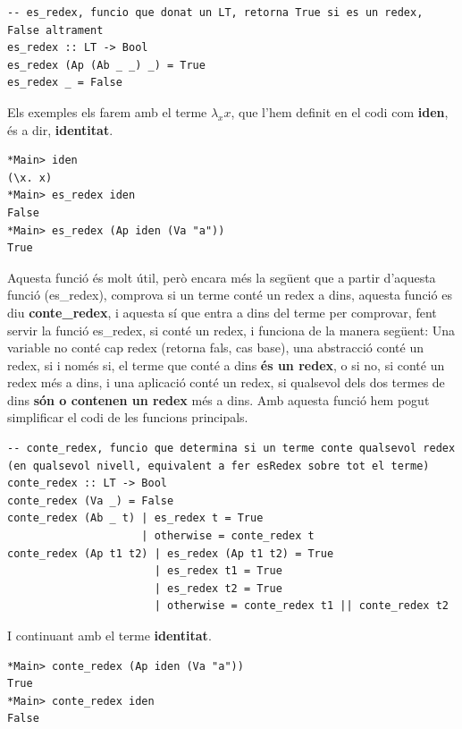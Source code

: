 \documentclass[10pt,a4paper]{article}
\begin{document}
\lstset{language=Haskell, breaklines=true, basicstyle=\footnotesize}
\begin{lstlisting}[frame=mystyle]
-- es_redex, funcio que donat un LT, retorna True si es un redex, False altrament
es_redex :: LT -> Bool
es_redex (Ap (Ab _ _) _) = True
es_redex _ = False
\end{lstlisting}

Els exemples els farem amb el terme $\lambda_x x$, que l'hem definit en el codi com \textbf{iden}, és a dir, \textbf{identitat}.

\lstset{language=Haskell, breaklines=true, basicstyle=\footnotesize}
\begin{lstlisting}[frame=mystyle]
*Main> iden
(\x. x)
*Main> es_redex iden
False
*Main> es_redex (Ap iden (Va "a"))
True
\end{lstlisting}

Aquesta funció és molt útil, però encara més la següent que a partir d'aquesta funció (es\_redex), comprova si un terme conté un redex a dins, aquesta funció es diu \textbf{conte\_redex}, i aquesta sí que entra a dins del terme per comprovar, fent servir la funció es\_redex, si conté un redex, i funciona de la manera següent: Una variable no conté cap redex (retorna fals, cas base), una abstracció conté un redex, si i només si, el terme que conté a dins \textbf{és un redex}, o si no, si conté un redex més a dins, i una aplicació conté un redex, si qualsevol dels dos termes de dins \textbf{són o contenen un redex} més a dins. Amb aquesta funció hem pogut simplificar el codi de les funcions principals.

\lstset{language=Haskell, breaklines=true, basicstyle=\footnotesize}
\begin{lstlisting}[frame=mystyle]
-- conte_redex, funcio que determina si un terme conte qualsevol redex (en qualsevol nivell, equivalent a fer esRedex sobre tot el terme)
conte_redex :: LT -> Bool
conte_redex (Va _) = False
conte_redex (Ab _ t) | es_redex t = True
                     | otherwise = conte_redex t
conte_redex (Ap t1 t2) | es_redex (Ap t1 t2) = True
                       | es_redex t1 = True
                       | es_redex t2 = True
                       | otherwise = conte_redex t1 || conte_redex t2
\end{lstlisting}

I continuant amb el terme \textbf{identitat}.

\lstset{language=Haskell, breaklines=true, basicstyle=\footnotesize}
\begin{lstlisting}[frame=mystyle]
*Main> conte_redex (Ap iden (Va "a"))
True
*Main> conte_redex iden
False 
\end{lstlisting}
\end{document}
